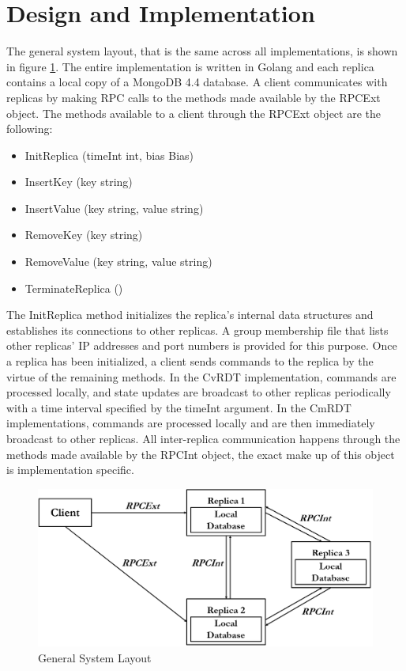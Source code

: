 \documentclass[sigconf,nonacm,10pt]{acmart}
\begin{document}
\section{Design and Implementation}
The general system layout, that is the same across all implementations, is shown in figure \ref{fig:sys}. The entire implementation is written in Golang and each replica contains a local copy of a MongoDB 4.4 database. A client communicates with replicas by making RPC calls to the methods made available by the RPCExt object. The methods available to a client through the RPCExt object are the following:
\begin{itemize}
 \item InitReplica (timeInt int, bias Bias)
 \item InsertKey (key string)
 \item InsertValue (key string, value string)
 \item RemoveKey (key string)
 \item RemoveValue (key string, value string)
 \item TerminateReplica ()
\end{itemize}

The InitReplica method initializes the replica's internal data structures and establishes its connections to other replicas. A group membership file that lists other replicas' IP addresses and port numbers is provided for this purpose. Once a replica has been initialized, a client sends commands to the replica by the virtue of the remaining methods. In the CvRDT implementation, commands are processed locally, and state updates are broadcast to other replicas periodically with a time interval specified by the timeInt argument. In the CmRDT implementations, commands are processed locally and are then immediately broadcast to other replicas. All inter-replica communication happens through the methods made available by the RPCInt object, the exact make up of this object is implementation specific.

\begin{figure}[h]
  \centering
  \includegraphics[width=\linewidth]{Fig1Sys}
  \caption{General System Layout}
  \label{fig:sys}
\end{figure}
\end{document}
